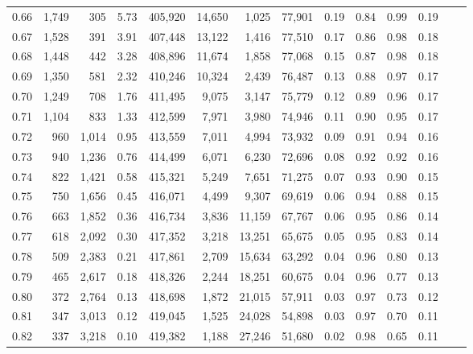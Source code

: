 \begin{tabular}{rrrrrrrrrrrrrr}
0.66 &  1,749 &    305 &     5.73 &  405,920 &   14,650 &   1,025 &  77,901 &  0.19 &  0.84 &  0.99 &      0.19 \\
0.67 &  1,528 &    391 &     3.91 &  407,448 &   13,122 &   1,416 &  77,510 &  0.17 &  0.86 &  0.98 &      0.18 \\
0.68 &  1,448 &    442 &     3.28 &  408,896 &   11,674 &   1,858 &  77,068 &  0.15 &  0.87 &  0.98 &      0.18 \\
0.69 &  1,350 &    581 &     2.32 &  410,246 &   10,324 &   2,439 &  76,487 &  0.13 &  0.88 &  0.97 &      0.17 \\
0.70 &  1,249 &    708 &     1.76 &  411,495 &    9,075 &   3,147 &  75,779 &  0.12 &  0.89 &  0.96 &      0.17 \\
0.71 &  1,104 &    833 &     1.33 &  412,599 &    7,971 &   3,980 &  74,946 &  0.11 &  0.90 &  0.95 &      0.17 \\
0.72 &    960 &  1,014 &     0.95 &  413,559 &    7,011 &   4,994 &  73,932 &  0.09 &  0.91 &  0.94 &      0.16 \\
0.73 &    940 &  1,236 &     0.76 &  414,499 &    6,071 &   6,230 &  72,696 &  0.08 &  0.92 &  0.92 &      0.16 \\
0.74 &    822 &  1,421 &     0.58 &  415,321 &    5,249 &   7,651 &  71,275 &  0.07 &  0.93 &  0.90 &      0.15 \\
0.75 &    750 &  1,656 &     0.45 &  416,071 &    4,499 &   9,307 &  69,619 &  0.06 &  0.94 &  0.88 &      0.15 \\
0.76 &    663 &  1,852 &     0.36 &  416,734 &    3,836 &  11,159 &  67,767 &  0.06 &  0.95 &  0.86 &      0.14 \\
0.77 &    618 &  2,092 &     0.30 &  417,352 &    3,218 &  13,251 &  65,675 &  0.05 &  0.95 &  0.83 &      0.14 \\
0.78 &    509 &  2,383 &     0.21 &  417,861 &    2,709 &  15,634 &  63,292 &  0.04 &  0.96 &  0.80 &      0.13 \\
0.79 &    465 &  2,617 &     0.18 &  418,326 &    2,244 &  18,251 &  60,675 &  0.04 &  0.96 &  0.77 &      0.13 \\
0.80 &    372 &  2,764 &     0.13 &  418,698 &    1,872 &  21,015 &  57,911 &  0.03 &  0.97 &  0.73 &      0.12 \\
0.81 &    347 &  3,013 &     0.12 &  419,045 &    1,525 &  24,028 &  54,898 &  0.03 &  0.97 &  0.70 &      0.11 \\
0.82 &    337 &  3,218 &     0.10 &  419,382 &    1,188 &  27,246 &  51,680 &  0.02 &  0.98 &  0.65 &      0.11 \\

\end{tabular}
